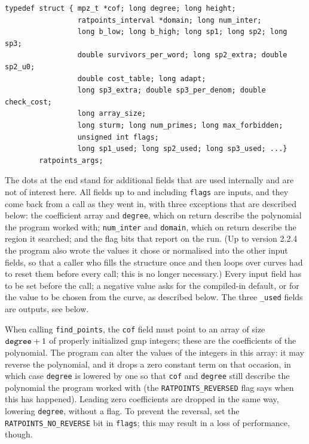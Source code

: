 \documentclass[12pt,a4paper,oneside]{amsart}
\begin{document}
\begin{verbatim}
typedef struct { mpz_t *cof; long degree; long height;
                 ratpoints_interval *domain; long num_inter;
                 long b_low; long b_high; long sp1; long sp2; long sp3;
                 double survivors_per_word; long sp2_extra; double sp2_u0;
                 double cost_table; long adapt;
                 long sp3_extra; double sp3_per_denom; double check_cost;
                 long array_size;
                 long sturm; long num_primes; long max_forbidden;
                 unsigned int flags;
                 long sp1_used; long sp2_used; long sp3_used; ...}
        ratpoints_args;
\end{verbatim}

The dots at the end stand for additional fields that are used internally
and are not of interest here. All fields up to and including \texttt{flags}
are inputs, and they come back from a call as they went in, with three
exceptions that are described below: the coefficient array and
\texttt{degree}, which on return describe the polynomial the program
worked with; \texttt{num\_inter} and \texttt{domain}, which on return
describe the region it searched; and the flag bits that report on the
run. (Up to version 2.2.4 the program also wrote the values it chose or
normalised into the other input fields, so that a caller who fills the
structure once and then loops over curves had to reset them before every
call; this is no longer necessary.) Every input field has to be set before
the call; a negative value asks for the compiled-in default, or for the
value to be chosen from the curve, as described below.
The three \texttt{\_used} fields are outputs, see below.

When calling \texttt{find\_points}, the
\texttt{cof} field must point to an array of size $\text{\texttt{degree}} + 1$
of properly initialized gmp integers; these are the coefficients of
the polynomial. The program can alter the values of the integers in this
array: it may reverse the polynomial, and it drops a zero constant term
on that occasion, in which case \texttt{degree} is lowered by one so that
\texttt{cof} and \texttt{degree} still describe the polynomial the program
worked with (the \texttt{RATPOINTS\_REVERSED} flag says when this has
happened). Leading zero coefficients are dropped in the same way, lowering
\texttt{degree}, without a flag.
To prevent the reversal, set the \texttt{RATPOINTS\_NO\_REVERSE} bit
in \texttt{flags}; this may result in a loss of performance, though.
\end{document}
